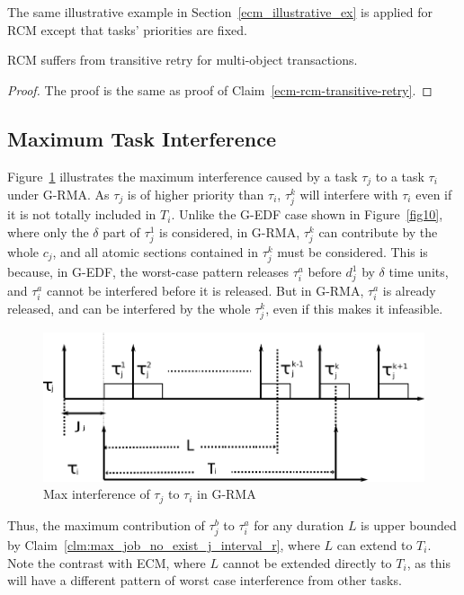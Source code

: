 The same illustrative example in Section~\ref{ecm_illustrative_ex} is applied for RCM except that tasks' priorities are fixed.
%
\begin{clm}\label{clm:rcm-transitive-retry}
RCM suffers from transitive retry for multi-object transactions.
\end{clm}
%
\begin{proof}\normalfont
%
The proof is the same as proof of Claim~\ref{ecm-rcm-transitive-retry}.
%
\end{proof}
%
\subsection{Maximum Task Interference}
%
Figure~\ref{fig11} illustrates the maximum interference caused by a task $\tau_{j}$
to a task $\tau_{i}$ under G-RMA. As $\tau_{j}$ is of higher priority than $\tau_{i}$,
$\tau_{j}^{k}$ will interfere with $\tau_{i}$ even if it is not totally
included in $T_{i}$. Unlike the G-EDF case shown in Figure~\ref{fig10}, 
where only the $\delta$ part of $\tau_{j}^{1}$ is considered, in G-RMA,
$\tau_{j}^{k}$ can contribute by the whole $c_{j}$, and all atomic
sections contained in $\tau_{j}^{k}$ must be considered. This is because, in G-EDF, the worst-case pattern releases $\tau_{i}^a$ before $d_{j}^{1}$
by $\delta$ time units, and $\tau_{i}^a$ cannot be interfered before it
is released. But in G-RMA, $\tau_{i}^a$ is already released, and can be
interfered by the whole $\tau_{j}^{k}$, even if this makes it infeasible.
%
\begin{figure}[htbp]
\centering
\includegraphics[scale=0.5]{figures/figure11}\caption{\label{fig11}Max interference of $\tau_{j}$ to $\tau_{i}$ in G-RMA}
\end{figure}

Thus, the maximum contribution of $\tau_{j}^b$ to $\tau_{i}^a$ for any duration
$L$ is upper bounded by Claim~\ref{clm:max_job_no_exist_j_interval_r}, where $L$ can extend to $T_{i}$. Note the contrast with ECM, where $L$ cannot be extended directly to $T_i$, as this will have a different pattern of worst case interference from other tasks.
%

